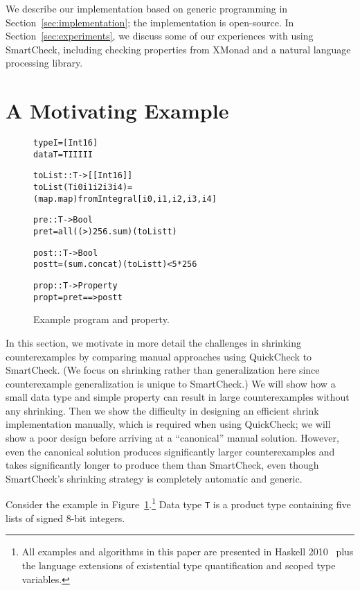 \documentclass{sigplanconf}
\newenvironment{code}{\begin{alltt}\footnotesize}{\end{alltt}}
\newcommand{\ttp}[1]{\texttt{#1}}
\begin{document}
We describe our implementation based on generic programming in
Section~\ref{sec:implementation}; the implementation is open-source.  In
Section~\ref{sec:experiments}, we discuss some of our experiences with using
SmartCheck, including checking properties from XMonad and a natural language
processing library.

\section{A Motivating Example}\label{sec:example}

\begin{figure}[ht]
\begin{code}
type I   = [Int16]
data T   = T I I I I I

toList :: T -> [[Int16]]
toList (T i0 i1 i2 i3 i4) =
  (map . map) fromIntegral [i0, i1, i2, i3, i4]

pre :: T -> Bool
pre t = all ((>) 256 . sum) (toList t)

post :: T -> Bool
post t = (sum . concat) (toList t) < 5 * 256

prop :: T -> Property
prop t = pre t ==> post t
\end{code}
  \caption{Example program and property.}
  \label{fig:initial}
\end{figure}

In this section, we motivate in more detail the challenges in shrinking
counterexamples by comparing manual approaches using QuickCheck to SmartCheck.
(We focus on shrinking rather than generalization here since counterexample
generalization is unique to SmartCheck.)  We will show how a small data type and
simple property can result in large counterexamples without any shrinking.  Then
we show the difficulty in designing an efficient shrink implementation manually,
which is required when using QuickCheck; we will show a poor
design before arriving at a ``canonical'' manual solution.  However, even the
canonical solution produces significantly larger counterexamples and takes
significantly longer to produce them than SmartCheck, even though SmartCheck's
shrinking strategy is completely automatic and generic.

Consider the example in Figure~\ref{fig:initial}.\footnote{All examples and
  algorithms in this paper are presented in Haskell 2010~\cite{haskell2010} plus
  the language extensions of existential type quantification and scoped type
  variables.}  Data type \ttp{T} is a product type containing five lists of
signed 8-bit integers.  %
\end{document}
